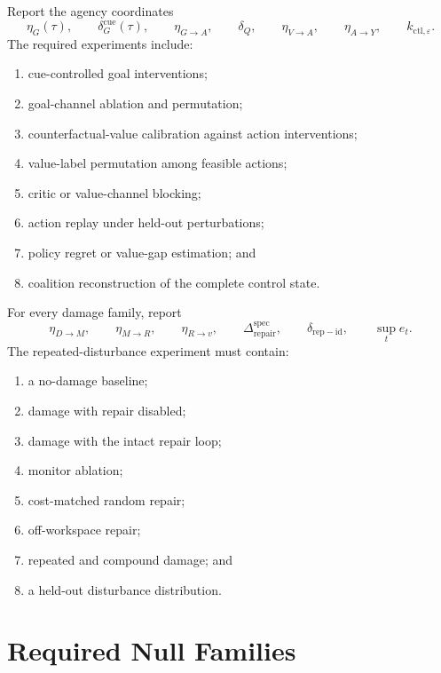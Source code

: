 
Report the agency coordinates
\[
\eta_G(\tau),
\qquad
\delta_G^{\mathrm{cue}}(\tau),
\qquad
\eta_{G\to A},
\qquad
\delta_Q,
\qquad
\eta_{V\to A},
\qquad
\eta_{A\to Y},
\qquad
 k_{\mathrm{ctl},\varepsilon}.
\]
The required experiments include:
\begin{enumerate}
\item cue-controlled goal interventions;
\item goal-channel ablation and permutation;
\item counterfactual-value calibration against action interventions;
\item value-label permutation among feasible actions;
\item critic or value-channel blocking;
\item action replay under held-out perturbations;
\item policy regret or value-gap estimation; and
\item coalition reconstruction of the complete control state.
\end{enumerate}


For every damage family, report
\[
\eta_{D\to M},
\qquad
\eta_{M\to R},
\qquad
\eta_{R\to v},
\qquad
\Delta_{\mathrm{repair}}^{\mathrm{spec}},
\qquad
\delta_{\mathrm{rep-id}},
\qquad
\sup_t e_t.
\]
The repeated-disturbance experiment must contain:
\begin{enumerate}
\item a no-damage baseline;
\item damage with repair disabled;
\item damage with the intact repair loop;
\item monitor ablation;
\item cost-matched random repair;
\item off-workspace repair;
\item repeated and compound damage; and
\item a held-out disturbance distribution.
\end{enumerate}

\section{Required Null Families}

